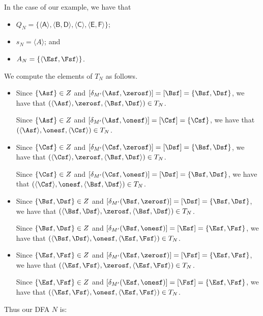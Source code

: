 In the case of our example, we have that
\begin{itemize}
\item $Q_N = \{\mathsf{\langle A\rangle, \langle B,D\rangle,
\langle C\rangle, \langle E,F\rangle}\}$;

\item $s_N = \langle A\rangle$; and

\item $A_N = \{\langle\Esf,\Fsf\rangle\}$.
\end{itemize}
We compute the elements of $T_N$ as follows.
\begin{itemize}
\item Since $\{\Asf\}\in Z$ and $[\delta_{M'}(\Asf,\zerosf)]=
  [\Bsf]=\{\Bsf,\Dsf\}$, we have that
  $(\langle\Asf\rangle,\zerosf,\langle\Bsf,\Dsf\rangle)\in T_N$.

  Since $\{\Asf\}\in Z$ and $[\delta_{M'}(\Asf,\onesf)]=
  [\Csf]=\{\Csf\}$, we have that
  $(\langle\Asf\rangle,\onesf,\langle\Csf\rangle)\in T_N$.

\item Since $\{\Csf\}\in Z$ and $[\delta_{M'}(\Csf,\zerosf)]=
  [\Dsf]=\{\Bsf,\Dsf\}$, we have that
  $(\langle\Csf\rangle,\zerosf,\langle\Bsf,\Dsf\rangle)\in T_N$.

  Since $\{\Csf\}\in Z$ and $[\delta_{M'}(\Csf,\onesf)]=
  [\Dsf]=\{\Bsf,\Dsf\}$, we have that
  $(\langle\Csf\rangle,\onesf,\langle\Bsf,\Dsf\rangle)\in T_N$.

\item Since $\{\Bsf,\Dsf\}\in Z$ and $[\delta_{M'}(\Bsf,\zerosf)]=
  [\Dsf]=\{\Bsf,\Dsf\}$, we have that
  $(\langle\Bsf,\Dsf\rangle,\zerosf,\langle\Bsf,\Dsf\rangle)\in T_N$.

  Since $\{\Bsf,\Dsf\}\in Z$ and $[\delta_{M'}(\Bsf,\onesf)]=
  [\Esf]=\{\Esf,\Fsf\}$, we have that
  $(\langle\Bsf,\Dsf\rangle,\onesf,\langle\Esf,\Fsf\rangle)\in T_N$.

\item Since $\{\Esf,\Fsf\}\in Z$ and $[\delta_{M'}(\Esf,\zerosf)]=
  [\Fsf]=\{\Esf,\Fsf\}$, we have that
  $(\langle\Esf,\Fsf\rangle,\zerosf,\langle\Esf,\Fsf\rangle)\in T_N$.

  Since $\{\Esf,\Fsf\}\in Z$ and $[\delta_{M'}(\Esf,\onesf)]=
  [\Fsf]=\{\Esf,\Fsf\}$, we have that
  $(\langle\Esf,\Fsf\rangle,\onesf,\langle\Esf,\Fsf\rangle)\in T_N$.
\end{itemize}
Thus our DFA $N$ is:
\begin{center}

\end{center}

